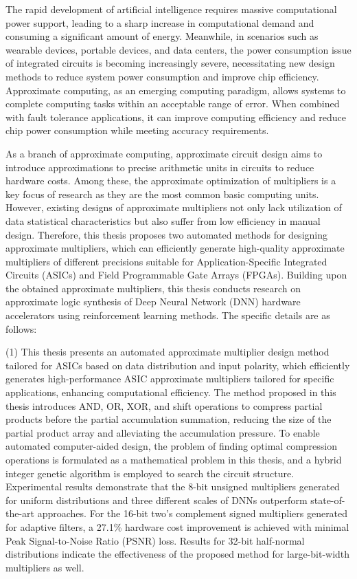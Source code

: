 \begin{abstract*}
    The rapid development of artificial intelligence requires massive computational power support, leading to a sharp increase in computational demand and consuming a significant amount of energy. Meanwhile, in scenarios such as wearable devices, portable devices, and data centers, the power consumption issue of integrated circuits is becoming increasingly severe, necessitating new design methods to reduce system power consumption and improve chip efficiency. Approximate computing, as an emerging computing paradigm, allows systems to complete computing tasks within an acceptable range of error. When combined with fault tolerance applications, it can improve computing efficiency and reduce chip power consumption while meeting accuracy requirements.
    
    As a branch of approximate computing, approximate circuit design aims to introduce approximations to precise arithmetic units in circuits to reduce hardware costs. Among these, the approximate optimization of multipliers is a key focus of research as they are the most common basic computing units. However, existing designs of approximate multipliers not only lack utilization of data statistical characteristics but also suffer from low efficiency in manual design. Therefore, this thesis proposes two automated methods for designing approximate multipliers, which can efficiently generate high-quality approximate multipliers of different precisions suitable for Application-Specific Integrated Circuits (ASICs) and Field Programmable Gate Arrays (FPGAs). Building upon the obtained approximate multipliers, this thesis conducts research on approximate logic synthesis of Deep Neural Network (DNN) hardware accelerators using reinforcement learning methods. The specific details are as follows:

    (1) This thesis presents an automated approximate multiplier design method tailored for ASICs based on data distribution and input polarity, which efficiently generates high-performance ASIC approximate multipliers tailored for specific applications, enhancing computational efficiency. The method proposed in this thesis introduces AND, OR, XOR, and shift operations to compress partial products before the partial accumulation summation, reducing the size of the partial product array and alleviating the accumulation pressure. To enable automated computer-aided design, the problem of finding optimal compression operations is formulated as a mathematical problem in this thesis, and a hybrid integer genetic algorithm is employed to search the circuit structure. Experimental results demonstrate that the 8-bit unsigned multipliers generated for uniform distributions and three different scales of DNNs outperform state-of-the-art approaches. For the 16-bit two's complement signed multipliers generated for adaptive filters, a 27.1\% hardware cost improvement is achieved with minimal Peak Signal-to-Noise Ratio (PSNR) loss. Results for 32-bit half-normal distributions indicate the effectiveness of the proposed method for large-bit-width multipliers as well.


\end{abstract*}
